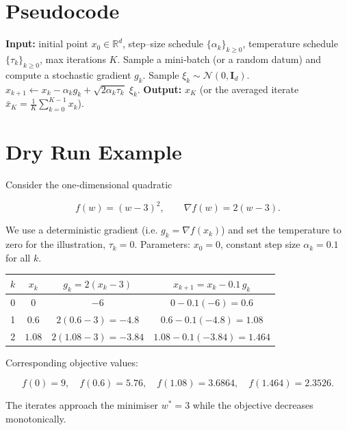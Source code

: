 \documentclass{article}
\newcommand{\R}{\mathbb{R}}
\begin{document}
\section*{Pseudocode}
\begin{algorithm}[H]
\caption{SGLD‑D}
\begin{algorithmic}[1]
\State \textbf{Input:} initial point $x_{0}\in\R^{d}$, step–size schedule $\{\alpha_{k}\}_{k\ge0}$, temperature schedule $\{\tau_{k}\}_{k\ge0}$, max iterations $K$.
    \State Sample a mini‑batch (or a random datum) and compute a stochastic gradient $g_{k}$.
    \State Sample $\xi_{k}\sim\mathcal N(0,\mathbf I_{d})$.
    \State $x_{k+1}\gets x_{k}-\alpha_{k}g_{k}+\sqrt{2\alpha_{k}\tau_{k}}\;\xi_{k}$.
\EndFor
\State \textbf{Output:} $x_{K}$ (or the averaged iterate $\bar x_{K}=\frac{1}{K}\sum_{k=0}^{K-1}x_{k}$).
\end{algorithmic}
\end{algorithm}

\section*{Dry Run Example}
Consider the one‑dimensional quadratic  

\[
f(w)=(w-3)^{2},\qquad \nabla f(w)=2(w-3).
\]

We use a deterministic gradient (i.e. $g_{k}=\nabla f(x_{k})$) and set the temperature to zero for the illustration, $\tau_{k}=0$.  
Parameters: $x_{0}=0$, constant step size $\alpha_{k}=0.1$ for all $k$.

\begin{center}
\begin{tabular}{c|c|c|c}
$k$ & $x_{k}$ & $g_{k}=2(x_{k}-3)$ & $x_{k+1}=x_{k}-0.1\,g_{k}$ \\ \hline
0 & $0$ & $-6$ & $0-0.1(-6)=0.6$ \\ 
1 & $0.6$ & $2(0.6-3)=-4.8$ & $0.6-0.1(-4.8)=1.08$ \\ 
2 & $1.08$ & $2(1.08-3)=-3.84$ & $1.08-0.1(-3.84)=1.464$ \\ 
\end{tabular}
\end{center}

Corresponding objective values:

\[
f(0)=9,\quad f(0.6)=5.76,\quad f(1.08)=3.6864,\quad f(1.464)=2.3526.
\]

The iterates approach the minimiser $w^{*}=3$ while the objective decreases monotonically.
\end{document}
